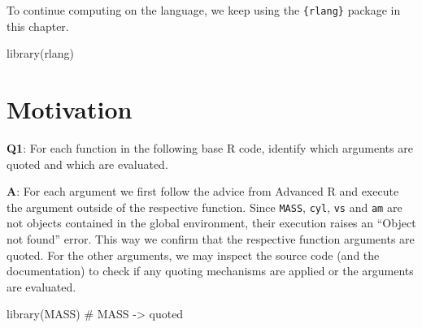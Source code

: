 \documentclass[
]{krantz}
\makeatletter
\newenvironment{Shaded}{\begin{snugshade}}{\end{snugshade}}
\newcommand{\CommentTok}[1]{\textcolor[rgb]{0.56,0.35,0.01}{\textit{#1}}}
\newcommand{\DecValTok}[1]{\textcolor[rgb]{0.00,0.00,0.81}{#1}}
\newcommand{\KeywordTok}[1]{\textcolor[rgb]{0.13,0.29,0.53}{\textbf{#1}}}
\newcommand{\NormalTok}[1]{#1}
\newcommand{\OperatorTok}[1]{\textcolor[rgb]{0.81,0.36,0.00}{\textbf{#1}}}
\newcommand{\StringTok}[1]{\textcolor[rgb]{0.31,0.60,0.02}{#1}}
\newenvironment{kframe}{%
\medskip{}
\setlength{\fboxsep}{.8em}
 \def\at@end@of@kframe{}%
 \ifinner\ifhmode%
  \def\at@end@of@kframe{\end{minipage}}%
  \begin{minipage}{\columnwidth}%
 \fi\fi%
 \def\FrameCommand##1{\hskip\@totalleftmargin \hskip-\fboxsep
 \colorbox{shadecolor}{##1}\hskip-\fboxsep
     \hskip-\linewidth \hskip-\@totalleftmargin \hskip\columnwidth}%
 \MakeFramed {\advance\hsize-\width
   \@totalleftmargin\z@ \linewidth\hsize
   \@setminipage}}%
 {\par\unskip\endMakeFramed%
 \at@end@of@kframe}
\renewenvironment{Shaded}{\begin{kframe}}{\end{kframe}}
\renewcommand{\KeywordTok} [1]{\textcolor[rgb]{0.00,0.44,0.13}{{#1}}}
\renewcommand{\DecValTok}  [1]{\textcolor[rgb]{0.25,0.63,0.44}{{#1}}}
\renewcommand{\StringTok}  [1]{\textcolor[rgb]{0.25,0.44,0.63}{{#1}}}
\renewcommand{\CommentTok} [1]{\textcolor[rgb]{0.38,0.63,0.69}{{#1}}}
\renewcommand{\NormalTok}  [1]{{#1}}
\makeatother
\begin{document}
To continue computing on the language, we keep using the \texttt{\{rlang\}} package in this chapter.

\begin{Shaded}
\begin{Highlighting}[]
\KeywordTok{library}\NormalTok{(rlang)}
\end{Highlighting}
\end{Shaded}


\hypertarget{motivation}{%
\section{Motivation}\label{motivation}}

\textbf{{Q1}}: For each function in the following base R code, identify which arguments are quoted and which are evaluated.

\begin{Shaded}
\end{Shaded}

\textbf{{A}}: For each argument we first follow the advice from Advanced R and execute the argument outside of the respective function. Since \texttt{MASS}, \texttt{cyl}, \texttt{vs} and \texttt{am} are not objects contained in the global environment, their execution raises an ``Object not found'' error. This way we confirm that the respective function arguments are quoted. For the other arguments, we may inspect the source code (and the documentation) to check if any quoting mechanisms are applied or the arguments are evaluated.

\begin{Shaded}
\begin{Highlighting}[]
\KeywordTok{library}\NormalTok{(MASS)  }\CommentTok{# MASS -> quoted}
\end{Highlighting}
\end{Shaded}
\end{document}
